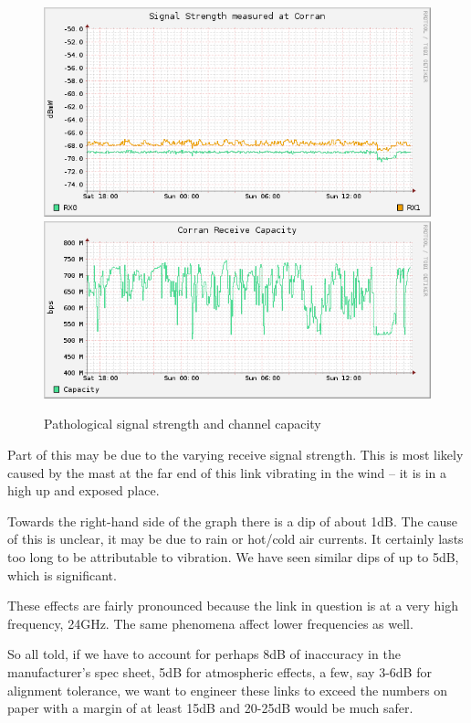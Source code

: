 \begin{figure}[h]
  \begin{center}
    \includegraphics[width=\textwidth]{af24-cor-signal.png}
    \includegraphics[width=\textwidth]{af24-cor-cap.png}
  \end{center}
  \caption{Pathological signal strength and channel capacity}
  \label{fig:thrashing}
\end{figure}

Part of this may be due to the varying receive signal strength. This
is most likely caused by the mast at the far end of this link
vibrating in the wind -- it is in a high up and exposed place.

Towards the right-hand side of the graph there is a dip of about
1dB. The cause of this is unclear, it may be due to rain or hot/cold
air currents. It certainly lasts too long to be attributable to
vibration. We have seen similar dips of up to 5dB, which is
significant. 

These effects are fairly pronounced because the link in question is at
a very high frequency, 24GHz. The same phenomena affect lower
frequencies as well.

So all told, if we have to account for perhaps 8dB of inaccuracy in
the manufacturer's spec sheet, 5dB for atmospheric effects, a few, say
3-6dB for alignment tolerance, we want to engineer these links to
exceed the numbers on paper with a margin of at least 15dB and 20-25dB
would be much safer.

